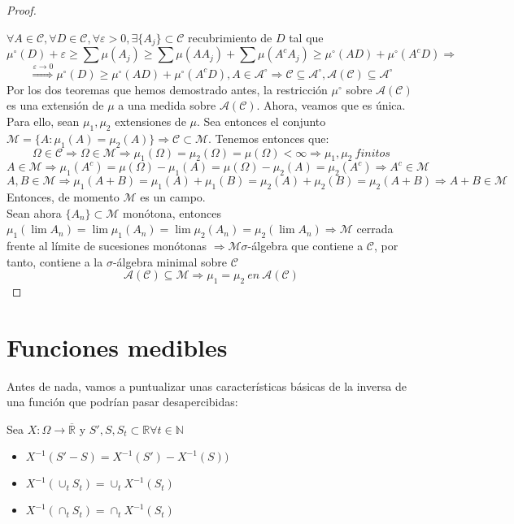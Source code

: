\begin{proof}
  \

$\forall A \in \mathcal{C}, \forall D \in \mathcal{C}, \forall \varepsilon>0, \exists \{A_j\} \subset \mathcal{C}$ recubrimiento de $D$ tal que
$$\mu^\circ(D) + \varepsilon \geq \sum \mu(A_j) \geq \sum \mu (AA_j) + \sum \mu (A^cA_j) \geq \mu^\circ(AD) + \mu^\circ(A^cD) \Rightarrow$$
$$ \stackrel{\varepsilon \to 0}{\Rightarrow} \mu^\circ(D) \geq \mu^\circ(AD) + \mu^\circ(A^cD), A \in \mathcal{A}^\circ \Rightarrow \mathcal{C} \subseteq \mathcal{A}^\circ, \mathcal{A}(\mathcal{C}) \subseteq \mathcal{A}^\circ $$
Por los dos teoremas que hemos demostrado antes, la restricción $\mu^\circ$ sobre $\mathcal{A}(\mathcal{C})$ es una extensión de $\mu$ a una medida sobre $\mathcal{A}(\mathcal{C})$. Ahora, veamos que es única. Para ello, sean $\mu_1, \mu_2$ extensiones de $\mu$. Sea entonces el conjunto $\mathcal{M} = \{A: \mu_1(A) = \mu_2(A)\} \Rightarrow \mathcal{C} \subset \mathcal{M}$. Tenemos entonces que:
$$ \Omega \in \mathcal{C} \Rightarrow \Omega \in \mathcal{M} \Rightarrow \mu_1(\Omega) = \mu_2(\Omega) = \mu(\Omega) < \infty \Rightarrow \mu_1, \mu_2 \: finitos $$
$$ A \in \mathcal{M} \Rightarrow \mu_1(A^c) = \mu(\Omega) - \mu_1(A) = \mu(\Omega) - \mu_2(A) = \mu_2(A^c) \Rightarrow A^c \in \mathcal{M} $$
$$ A,B \in \mathcal{M} \Rightarrow \mu_1(A+B) = \mu_1(A) + \mu_1(B) = \mu_2(A) + \mu_2(B) = \mu_2(A+B) \Rightarrow A+B \in \mathcal{M}$$
Entonces, de momento $\mathcal{M}$ es un campo.\\

Sean ahora $\{A_n\} \subset \mathcal{M}$ monótona, entonces $\mu_1(\lim A_n) = \lim \mu_1(A_n) = \lim \mu_2(A_n) = \mu_2(\lim A_n) \Rightarrow \mathcal{M}$ cerrada frente al límite de sucesiones monótonas $\Rightarrow \mathcal{M} \sigma$-álgebra que contiene a $\mathcal{C}$, por tanto, contiene a la $\sigma$-álgebra minimal sobre $\mathcal{C}$
$$ \mathcal{A}(\mathcal{C}) \subseteq \mathcal{M} \Rightarrow \mu_1 = \mu_2 \: en \: \mathcal{A}(\mathcal{C})$$


\end{proof}

\section{Funciones medibles}

Antes de nada, vamos a puntualizar unas características básicas de la inversa de una función que podrían pasar desapercibidas:

\begin{lemma}
  Sea $X: \Omega \to \overline{\mathbb{R}}$ y $S',S, S_t \subset \mathbb{R} \forall t \in \mathbb{N}$
  \begin{itemize}
    \item $X^{-1}(S'-S)=X^{-1}(S')-X^{-1}(S))$  
    \item $X^{-1}(\cup_t S_t)=\cup_t X^{-1}(S_t)$
    \item $X^{-1}(\cap_t S_t)=\cap_t X^{-1}(S_t)$
  \end{itemize}
\end{lemma}

